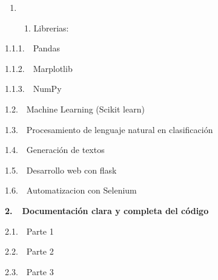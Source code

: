 \documentclass[letterpaper]{article}
\begin{document}
\begin{enumerate}[series=listWWNumxiii,label=\arabic*.,ref=\arabic*]
\item \begin{enumerate}[series=listWWNumxiii,label=\arabic{enumi}.\arabic*.,ref=\arabic{enumi}.\arabic*]
\item {
\foreignlanguage{english}{Librerias:}}
\end{enumerate}
\end{enumerate}

\bigskip

{
\foreignlanguage{english}{1.1.1.\ \ Pandas}}

{
\foreignlanguage{english}{1.1.2.\ \ Marplotlib}}

{
\foreignlanguage{english}{1.1.3.\ \ NumPy}}


\bigskip

{
\foreignlanguage{english}{1.2.\ \ Machine Learning (Scikit learn)}}

{
1.3.\ \ Procesamiento de lenguaje natural en clasificación}

{
1.4.\ \ Generación de textos}

{
1.5.\ \ Desarrollo web con flask}

{
1.6.\ \ Automatizacion con Selenium}


\bigskip


\bigskip

{
\textbf{2.\ \ Documentación clara y completa del código}}


\bigskip

{
2.1.\ \ Parte 1}

{
2.2.\ \ Parte 2}

{
2.3.\ \ Parte 3\ \ }

\clearpage
\pagestyle{Convertedii}

\bigskip


\bigskip


\bigskip


\bigskip


\bigskip


\bigskip


\bigskip


\bigskip


\bigskip
\end{document}

